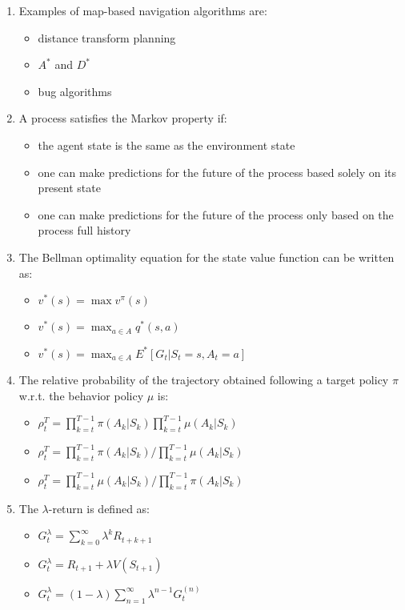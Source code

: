 \documentclass[openany]{book}
\theoremstyle{definition}
\theoremstyle{remark}
\begin{document}
\begin{enumerate}
    \item Examples of map-based navigation algorithms are:
    \begin{itemize}
        \item[\checkmark] distance transform planning
        \item[\checkmark] $A^*$ and $D^*$
        \item[] bug algorithms
    \end{itemize}

    \item A process satisfies the Markov property if:
    \begin{itemize}
        \item[] the agent state is the same as the environment state
        \item[\checkmark] one can make predictions for the future of the process based solely on its present state
        \item[] one can make predictions for the future of the process only based on the process full history
    \end{itemize}

    \item The Bellman optimality equation for the state value function can be written as:
    \begin{itemize}
        \item[] $v^*(s) = \max v^\pi(s)$
        \item[\checkmark] $v^*(s) = \max_{a\in A} q^*(s,a)$
        \item[\checkmark] $v^*(s) = \max_{a\in A} E^*[G_t|S_t = s, A_t = a]$
    \end{itemize}

    \item The relative probability of the trajectory obtained following a target policy $\pi$ w.r.t. the behavior policy $\mu$ is:
    \begin{itemize}
        \item[] $\rho^T_t = \prod_{k=t}^{T-1} \pi(A_k|S_k)\prod_{k=t}^{T-1}\mu(A_k|S_k)$
        \item[\checkmark] $\rho^T_t = \prod_{k=t}^{T-1} \pi(A_k|S_k)/\prod_{k=t}^{T-1}\mu(A_k|S_k)$
        \item[] $\rho^T_t = \prod_{k=t}^{T-1} \mu(A_k|S_k)/\prod_{k=t}^{T-1}\pi(A_k|S_k)$
    \end{itemize}

    \item The $\lambda$-return is defined as:
    \begin{itemize}
        \item[] $G^\lambda_t = \sum_{k=0}^\infty \lambda^k R_{t+k+1}$
        \item[] $G^\lambda_t = R_{t+1} + \lambda V(S_{t+1})$
        \item[\checkmark] $G^\lambda_t = (1-\lambda)\sum_{n=1}^\infty \lambda^{n-1}G^{(n)}_t$
    \end{itemize}


\end{enumerate}
\end{document}
